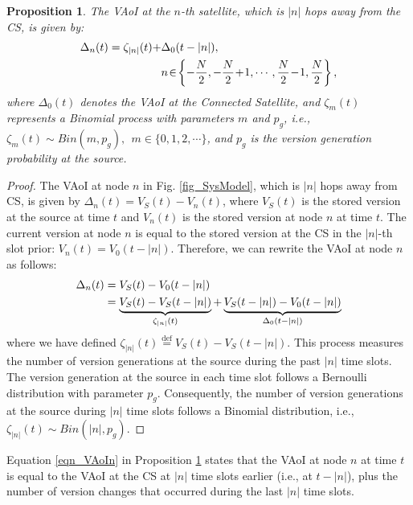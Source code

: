 \documentclass[lettersize,journal]{IEEEtran}
\newtheorem{proposition}{Proposition}
\begin{document}
    \begin{proposition}
    \label{Prop_VAoIn}
    The VAoI at the $n$-th satellite, which is $|n|$ hops away from the CS, is given by:
    \begin{align}
        \label{eqn_VAoIn}
        \Delta_{n}(t) = \zeta_{|n|}(t) +& \Delta_0(t-|n|),\\ &n \!\in\! \left\{-\frac{N}{2},-\frac{N}{2}\!+\!1,\cdots,\frac{N}{2}\!-\!1,\frac{N}{2}\right\}, \notag
    \end{align}
    where $\Delta_0(t)$ denotes the VAoI at the Connected Satellite, and $\zeta_{m}(t)$ represents a Binomial process with parameters $m$ and $p_g$, i.e., $\zeta_{m}(t) \sim Bin(m, p_g), \ \ m \in \{0,1,2, \cdots \}$,
    and $p_g$ is the version generation probability at the source.
    \end{proposition}

    \begin{proof}
    The VAoI at node $n$ in Fig. \ref{fig_SysModel}, which is $|n|$ hops away from CS, is given by $\Delta_{n}(t)\!=\!V_S(t) \!-\! V_{n}(t)$, where $V_S(t)$ is the stored version at the source at time $t$ and $V_{n}(t)$ is the stored version at node $n$ at time $t$. The current version at node $n$ is equal to the stored version at the CS in the $|n|$-th slot prior: $V_{n}(t)=V_0(t-|n|).$ Therefore, we can rewrite the VAoI at node $n$ as follows:
    \begin{align}
        \label{eqn_ProofVAoIn}
        \Delta_{n}(t) &= V_S(t) - V_0(t-|n|) \notag \\
        & = \underbrace{V_S(t) - V_S(t-|n|)}_{\zeta_{|n|}(t)} + \underbrace{V_S(t-|n|) - V_0(t-|n|)}_{\Delta_0(t-|n|)} \notag
    \end{align}
    where we have defined $\zeta_{|n|}(t) \overset{\text{def}}{=} V_S(t) - V_S(t-|n|)$. This process measures the number of version generations at the source during the past $|n|$ time slots. The version generation at the source in each time slot follows a Bernoulli distribution with parameter $p_g$. Consequently, the number of version generations at the source during $|n|$ time slots follows a Binomial distribution, i.e., $\zeta_{|n|}(t) \sim Bin(|n|, p_g).$
    \end{proof}

    Equation \eqref{eqn_VAoIn} in Proposition \ref{Prop_VAoIn} states that the VAoI at node $n$ at time $t$ is equal to the VAoI at the CS at $|n|$ time slots earlier (i.e., at $t - |n|$), plus the number of version changes that occurred during the last $|n|$ time slots.
\end{document}
